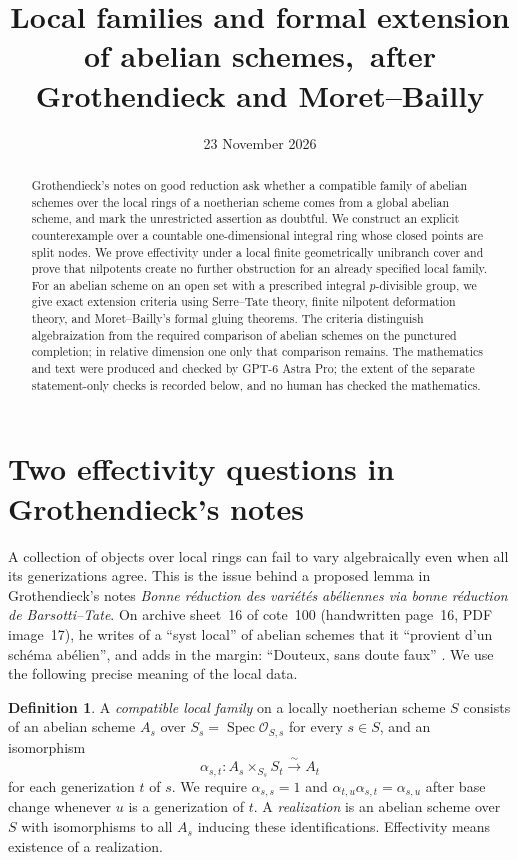 \documentclass[11pt]{article}
\title{Local families and formal extension of abelian schemes,\ after Grothendieck and Moret--Bailly}
\author{}
\date{23 November 2026}
\theoremstyle{definition}\newtheorem{definition}[theorem]{Definition}
\theoremstyle{remark}\newtheorem{remark}[theorem]{Remark}
\newcommand{\Spec}{\operatorname{Spec}}
\newcommand{\OO}{\mathcal O}
\begin{document}
\maketitle
\begin{abstract}
Grothendieck's notes on good reduction ask whether a compatible family of abelian schemes over the local rings of a noetherian scheme comes from a global abelian scheme, and mark the unrestricted assertion as doubtful. We construct an explicit counterexample over a countable one-dimensional integral ring whose closed points are split nodes. We prove effectivity under a local finite geometrically unibranch cover and prove that nilpotents create no further obstruction for an already specified local family. For an abelian scheme on an open set with a prescribed integral $p$-divisible group, we give exact extension criteria using Serre--Tate theory, finite nilpotent deformation theory, and Moret--Bailly's formal gluing theorems. The criteria distinguish algebraization from the required comparison of abelian schemes on the punctured completion; in relative dimension one only that comparison remains. The mathematics and text were produced and checked by GPT-6 Astra Pro; the extent of the separate statement-only checks is recorded below, and no human has checked the mathematics.
\end{abstract}

\section{Two effectivity questions in Grothendieck's notes}

A collection of objects over local rings can fail to vary algebraically even when all its generizations agree. This is the issue behind a proposed lemma in Grothendieck's notes \emph{Bonne r\'eduction des vari\'et\'es ab\'eliennes via bonne r\'eduction de Barsotti--Tate}. On archive sheet~16 of cote~100 (handwritten page~16, PDF image~17), he writes of a ``syst local'' of abelian schemes that it ``provient d'un sch\'ema ab\'elien'', and adds in the margin: ``Douteux, sans doute faux'' \citep{GrothNotes}. We use the following precise meaning of the local data.

\begin{definition}\label{def:family}
A \emph{compatible local family} on a locally noetherian scheme $S$ consists of an abelian scheme $A_s$ over $S_s=\Spec\OO_{S,s}$ for every $s\in S$, and an isomorphism
\[
 \alpha_{s,t}:A_s\times_{S_s}S_t\xrightarrow{\sim}A_t
\]
for each generization $t$ of $s$. We require $\alpha_{s,s}=1$ and $\alpha_{t,u}\alpha_{s,t}=\alpha_{s,u}$ after base change whenever $u$ is a generization of $t$. A \emph{realization} is an abelian scheme over $S$ with isomorphisms to all $A_s$ inducing these identifications. Effectivity means existence of a realization.
\end{definition}
\end{document}
